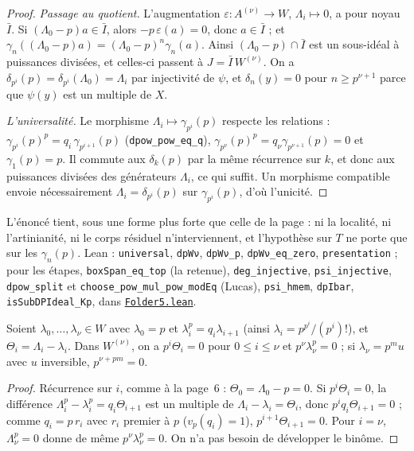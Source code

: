 \begin{proof}
\emph{Passage au quotient.} L'augmentation $\varepsilon : A^{(\nu)} \to W$, $\Lambda_i \mapsto 0$, a pour noyau $\bar I$. Si $(\Lambda_0 - p)a \in \bar I$, alors $-p\,\varepsilon(a) = 0$, donc $a \in \bar I$ ; et $\gamma_n((\Lambda_0 - p)a) = (\Lambda_0 - p)^n\gamma_n(a)$. Ainsi $(\Lambda_0 - p) \cap \bar I$ est un sous-idéal à puissances divisées, et celles-ci passent à $J = \bar I\,W^{(\nu)}$. On a $\delta_{p^i}(p) = \delta_{p^i}(\Lambda_0) = \Lambda_i$ par injectivité de $\psi$, et $\delta_n(y) = 0$ pour $n \geq p^{\nu+1}$ parce que $\psi(y)$ est un multiple de $X$.

\emph{L'universalité.} Le morphisme $\Lambda_i \mapsto \gamma_{p^i}(p)$ respecte les relations : $\gamma_{p^i}(p)^p = q_i\,\gamma_{p^{i+1}}(p)$ (\texttt{dpow\_pow\_eq\_q}), $\gamma_{p^\nu}(p)^p = q_\nu\gamma_{p^{\nu+1}}(p) = 0$ et $\gamma_1(p) = p$. Il commute aux $\delta_k(p)$ par la même récurrence sur $k$, et donc aux puissances divisées des générateurs $\Lambda_i$, ce qui suffit. Un morphisme compatible envoie nécessairement $\Lambda_i = \delta_{p^i}(p)$ sur $\gamma_{p^i}(p)$, d'où l'unicité.
\end{proof}

\noindent L'énoncé tient, sous une forme plus forte que celle de la page : ni la locali\-té, ni l'artinianité, ni le corps résiduel n'interviennent, et l'hypothèse sur $T$ ne porte que sur les $\gamma_n(p)$. Lean : \texttt{universal}, \texttt{dpWν}, \texttt{dpWν\_p}, \texttt{dpWν\_eq\_zero}, \texttt{presentation} ; pour les étapes, \texttt{boxSpan\_eq\_top} (la retenue), \texttt{deg\_injective}, \texttt{psi\_injective}, \texttt{dpow\_split} et \texttt{choose\_pow\_mul\_pow\_modEq} (Lucas), \texttt{psi\_hmem}, \texttt{dpIbar}, \texttt{isSubDPIdeal\_Kp}, dans \href{\leanblob/RingTheory/Folder5.lean}{\texttt{Folder5.\allowbreak{}lean}}.

\begin{encadre}
\begin{theoreme}
Soient $\lambda_0, \ldots, \lambda_\nu \in W$ avec $\lambda_0 = p$ et $\lambda_i^p = q_i\lambda_{i+1}$ (ainsi $\lambda_i = p^{p^i}/(p^i)!$), et $\Theta_i = \Lambda_i - \lambda_i$. Dans $W^{(\nu)}$, on a $p^i\Theta_i = 0$ pour $0 \leq i \leq \nu$ et $p^\nu\lambda_\nu^p = 0$ ; si $\lambda_\nu = p^m u$ avec $u$ inversible, $p^{\nu + pm} = 0$.
\end{theoreme}
\end{encadre}

\begin{proof}
Récurrence sur $i$, comme à la page~6 : $\Theta_0 = \Lambda_0 - p = 0$. Si $p^i\Theta_i = 0$, la différence $\Lambda_i^p - \lambda_i^p = q_i\Theta_{i+1}$ est un multiple de $\Lambda_i - \lambda_i = \Theta_i$, donc $p^i q_i \Theta_{i+1} = 0$ ; comme $q_i = p\,r_i$ avec $r_i$ premier à $p$ ($v_p(q_i) = 1$), $p^{i+1}\Theta_{i+1} = 0$. Pour $i = \nu$, $\Lambda_\nu^p = 0$ donne de même $p^\nu\lambda_\nu^p = 0$. On n'a pas besoin de développer le binôme.
\end{proof}

